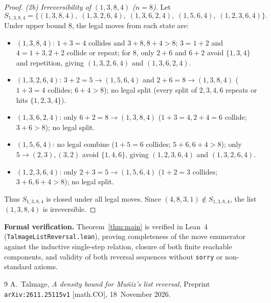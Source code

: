 \documentclass[11pt]{article}
\begin{document}
\begin{proof}
\emph{(2b) Irreversibility of $(1, 3, 8, 4)$ ($n = 8$).} Let
\[
  S_{1, 3, 8, 4} = \bigl\{(1, 3, 8, 4),\; (1, 3, 2, 6, 4),\; (1, 3, 6, 2, 4),\; (1, 5, 6, 4),\; (1, 2, 3, 6, 4)\bigr\}.
\]
Under upper bound $8$, the legal moves from each state are:
\begin{itemize}
  \item $(1, 3, 8, 4)$: $1 + 3 = 4$ collides and $3 + 8, 8 + 4 > 8$; $3 = 1 + 2$ and $4 = 1 + 3, 2 + 2$ collide or repeat; for $8$, only $2 + 6$ and $6 + 2$ avoid $\{1, 3, 4\}$ and repetition, giving $(1, 3, 2, 6, 4)$ and $(1, 3, 6, 2, 4)$.
  \item $(1, 3, 2, 6, 4)$: $3 + 2 = 5 \to (1, 5, 6, 4)$ and $2 + 6 = 8 \to (1, 3, 8, 4)$ ($1 + 3 = 4$ collides; $6 + 4 > 8$); no legal split (every split of $2, 3, 4, 6$ repeats or hits $\{1, 2, 3, 4\}$).
  \item $(1, 3, 6, 2, 4)$: only $6 + 2 = 8 \to (1, 3, 8, 4)$ ($1 + 3 = 4, 2 + 4 = 6$ collide; $3 + 6 > 8$); no legal split.
  \item $(1, 5, 6, 4)$: no legal combine ($1 + 5 = 6$ collides; $5 + 6, 6 + 4 > 8$); only $5 \to (2, 3), (3, 2)$ avoid $\{1, 4, 6\}$, giving $(1, 2, 3, 6, 4)$ and $(1, 3, 2, 6, 4)$.
  \item $(1, 2, 3, 6, 4)$: only $2 + 3 = 5 \to (1, 5, 6, 4)$ ($1 + 2 = 3$ collides; $3 + 6, 6 + 4 > 8$); no legal split.
\end{itemize}
Thus $S_{1, 3, 8, 4}$ is closed under all legal moves. Since $(4, 8, 3, 1) \notin S_{1, 3, 8, 4}$, the list $(1, 3, 8, 4)$ is irreversible.
\end{proof}

\noindent\textbf{Formal verification.} Theorem~\ref{thm:main} is verified in Lean~4 (\texttt{TalmageListReversal.lean}), proving completeness of the move enumerator against the inductive single-step relation, closure of both finite reachable components, and validity of both reversal sequences without \texttt{sorry} or non-standard axioms.

\begin{thebibliography}{9}
A.~Talmage,
\emph{A density bound for Mu\~{n}iz's list reversal},
Preprint \texttt{arXiv:2611.25115v1} [math.CO], 18~November 2026.
\end{thebibliography}
\end{document}

